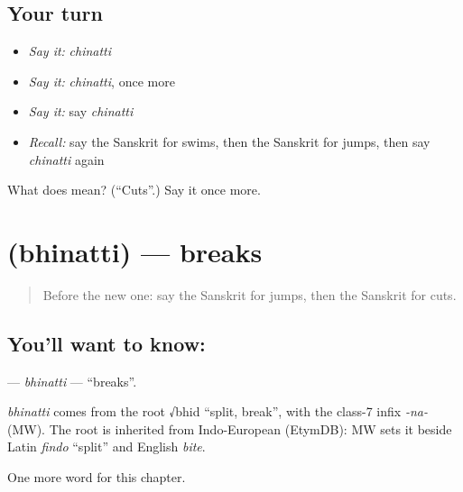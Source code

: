 \subsection*{Your turn}
\begin{itemize}
\raggedright
  \item \emph{Say it:} \emph{chinatti}
  \item \emph{Say it:} \emph{chinatti}, once more
  \item \emph{Say it:} say \emph{chinatti}
  \item \emph{Recall:} say the Sanskrit for swims, then the Sanskrit for jumps, then say \emph{chinatti} again
\end{itemize}

\begin{tcolorbox}[breakable,colback=teal!4,colframe=teal!35!black,title={Before you move on}]
What does  mean? (\textquotedblleft{}Cuts\textquotedblright{}.) Say it once more.
\end{tcolorbox}
\section[\texorpdfstring{\sk{भिनत्ति} (bhinatti)}{भिनत्ति (bhinatti)}]{ (bhinatti) — breaks}

\label{lesson:SA-C134-bhinatti}



\begin{quote}
Before the new one: say the Sanskrit for jumps, then the Sanskrit for cuts.
\end{quote}

\subsection*{You'll want to know: }
\textbf{} — \emph{bhinatti} — \textquotedblleft{}breaks\textquotedblright{}.

\begin{cousinweb}
\emph{bhinatti} comes from the root √bhid \textquotedblleft{}split, break\textquotedblright{}, with the class-7 infix \emph{-na-} (MW). The root is inherited from Indo-European (EtymDB): MW sets it beside Latin \emph{findo} \textquotedblleft{}split\textquotedblright{} and English \emph{bite}.
\end{cousinweb}

\begin{grammarlens}[title={What you've built}]
One more word for this chapter.
\end{grammarlens}

